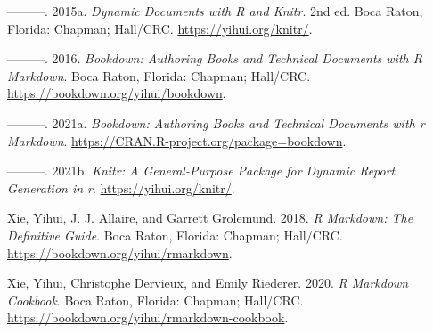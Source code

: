 \documentclass[
]{book}
\newlength{\cslhangindent}
\newlength{\cslentryspacingunit} %
\newenvironment{CSLReferences}[2] %
 {%
  \setlength{\parindent}{0pt}
  \ifodd #1
  \let\oldpar\par
  \def\par{\hangindent=\cslhangindent\oldpar}
  \fi
  \setlength{\parskip}{#2\cslentryspacingunit}
 }%
 {}
\begin{document}
\begin{CSLReferences}{1}{0}
\leavevmode{}%
---------. 2015a. \emph{Dynamic Documents with {R} and Knitr}. 2nd ed. Boca Raton, Florida: Chapman; Hall/CRC. \url{https://yihui.org/knitr/}.

\leavevmode{}%
---------. 2016. \emph{Bookdown: Authoring Books and Technical Documents with {R} Markdown}. Boca Raton, Florida: Chapman; Hall/CRC. \url{https://bookdown.org/yihui/bookdown}.

\leavevmode{}%
---------. 2021a. \emph{Bookdown: Authoring Books and Technical Documents with r Markdown}. \url{https://CRAN.R-project.org/package=bookdown}.

\leavevmode{}%
---------. 2021b. \emph{Knitr: A General-Purpose Package for Dynamic Report Generation in r}. \url{https://yihui.org/knitr/}.

\leavevmode{}%
Xie, Yihui, J. J. Allaire, and Garrett Grolemund. 2018. \emph{R Markdown: The Definitive Guide}. Boca Raton, Florida: Chapman; Hall/CRC. \url{https://bookdown.org/yihui/rmarkdown}.

\leavevmode{}%
Xie, Yihui, Christophe Dervieux, and Emily Riederer. 2020. \emph{R Markdown Cookbook}. Boca Raton, Florida: Chapman; Hall/CRC. \url{https://bookdown.org/yihui/rmarkdown-cookbook}.

\end{CSLReferences}
\end{document}
